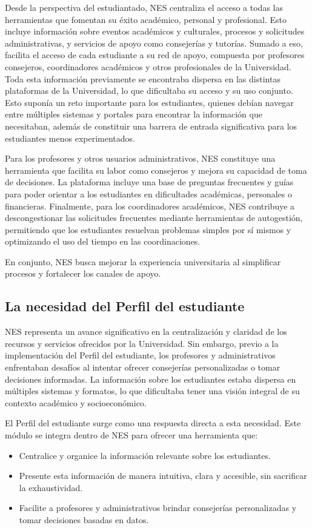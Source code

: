Desde la perspectiva del estudiantado, NES centraliza el acceso a todas las herramientas que fomentan su éxito académico, personal y profesional. Esto incluye información sobre eventos académicos y culturales, procesos y solicitudes administrativas, y servicios de apoyo como consejerías y tutorías. Sumado a eso, facilita el acceso de cada estudiante a su red de apoyo, compuesta por profesores consejeros, coordinadores académicos y otros profesionales de la Universidad. Toda esta información previamente se encontraba dispersa en las distintas plataformas de la Universidad, lo que dificultaba su acceso y su uso conjunto. Esto suponía un reto importante para los estudiantes, quienes debían navegar entre múltiples sistemas y portales para encontrar la información que necesitaban, además de constituir una barrera de entrada significativa para los estudiantes menos experimentados.

Para los profesores y otros usuarios administrativos, NES constituye una herramienta que facilita su labor como consejeros y mejora su capacidad de toma de decisiones. La plataforma incluye una base de preguntas frecuentes y guías para poder orientar a los estudiantes en dificultades académicas, personales o financieras. Finalmente, para los coordinadores académicos, NES contribuye a descongestionar las solicitudes frecuentes mediante herramientas de autogestión, permitiendo que los estudiantes resuelvan problemas simples por sí mismos y optimizando el uso del tiempo en las coordinaciones. 

En conjunto, NES busca mejorar la experiencia universitaria al simplificar procesos y fortalecer los canales de apoyo.

\subsection{La necesidad del Perfil del estudiante}

NES representa un avance significativo en la centralización y claridad de los recursos y servicios ofrecidos por la Universidad. Sin embargo, previo a la implementación del Perfil del estudiante, los profesores y administrativos enfrentaban desafíos al intentar ofrecer consejerías personalizadas o tomar decisiones informadas. La información sobre los estudiantes estaba dispersa en múltiples sistemas y formatos, lo que dificultaba tener una visión integral de su contexto académico y socioeconómico.

El Perfil del estudiante surge como una respuesta directa a esta necesidad. Este módulo se integra dentro de NES para ofrecer una herramienta que:
\begin{itemize}
    \item Centralice y organice la información relevante sobre los estudiantes.
    \item Presente esta información de manera intuitiva, clara y accesible, sin sacrificar la exhaustividad.
    \item Facilite a profesores y administrativos brindar consejerías personalizadas y tomar decisiones basadas en datos.
\end{itemize}

